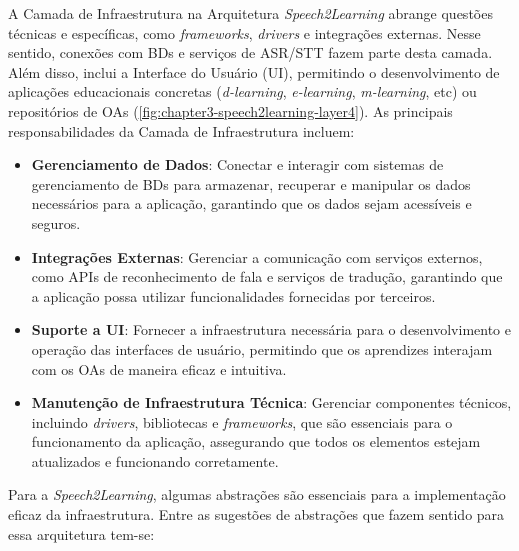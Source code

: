 A Camada de Infraestrutura na Arquitetura \textit{Speech2Learning} abrange questões técnicas e específicas, como \textit{frameworks}, \textit{drivers} e integrações externas. Nesse sentido, conexões com BDs e serviços de ASR/STT fazem parte desta camada. Além disso, inclui a Interface do Usuário (UI), permitindo o desenvolvimento de aplicações educacionais concretas (\textit{d-learning}, \textit{e-learning}, \textit{m-learning}, etc) ou repositórios de OAs (\autoref{fig:chapter3-speech2learning-layer4}). As principais responsabilidades da Camada de Infraestrutura incluem:

\begin{itemize}
    \item \textbf{Gerenciamento de Dados}: Conectar e interagir com sistemas de gerenciamento de BDs para armazenar, recuperar e manipular os dados necessários para a aplicação, garantindo que os dados sejam acessíveis e seguros.

    \item \textbf{Integrações Externas}: Gerenciar a comunicação com serviços externos, como APIs de reconhecimento de fala e serviços de tradução, garantindo que a aplicação possa utilizar funcionalidades fornecidas por terceiros.

    \item \textbf{Suporte a UI}: Fornecer a infraestrutura necessária para o desenvolvimento e operação das interfaces de usuário, permitindo que os aprendizes interajam com os OAs de maneira eficaz e intuitiva.

    \item \textbf{Manutenção de Infraestrutura Técnica}: Gerenciar componentes técnicos, incluindo \textit{drivers}, bibliotecas e \textit{frameworks}, que são essenciais para o funcionamento da aplicação, assegurando que todos os elementos estejam atualizados e funcionando corretamente.
\end{itemize}

Para a \textit{Speech2Learning}, algumas abstrações são essenciais para a implementação eficaz da infraestrutura. Entre as sugestões de abstrações que fazem sentido para essa arquitetura tem-se:

